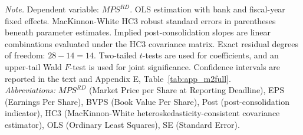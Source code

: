 \vspace{4pt}
{\footnotesize\noindent
\textit{Note.} Dependent variable: $\mathit{MPS}^{RD}$. OLS estimation with bank and fiscal-year fixed effects. MacKinnon-White HC3 robust standard errors in parentheses beneath parameter estimates. Implied post-consolidation slopes are linear combinations evaluated under the HC3 covariance matrix. Exact residual degrees of freedom: $28 - 14 = 14$. Two-tailed $t$-tests are used for coefficients, and an upper-tail Wald $F$-test is used for joint significance. Confidence intervals are reported in the text and Appendix E, Table~\ref{tab:app_m2full}. \\
\textit{Abbreviations:} $\mathit{MPS}^{RD}$ (Market Price per Share at Reporting Deadline), EPS (Earnings Per Share), BVPS (Book Value Per Share), Post (post-consolidation indicator), HC3 (MacKinnon-White heteroskedasticity-consistent covariance estimator), OLS (Ordinary Least Squares), SE (Standard Error).
\par}


